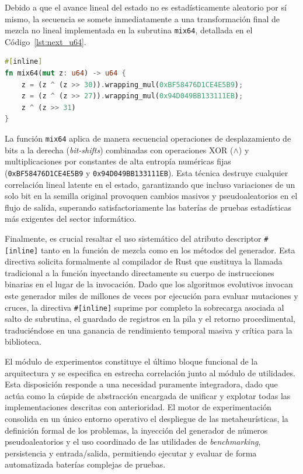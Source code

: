\documentclass[12pt,a4paper,twoside,openright]{book}
\begin{document}
        Debido a que el avance lineal del estado no es estadísticamente aleatorio por sí mismo, la secuencia se somete inmediatamente a una transformación final de mezcla no lineal implementada en la subrutina \texttt{mix64}, detallada en el Código~\ref{lst:next_u64}.

    \noindent
    \begin{samepage}
    \begin{lstlisting}[language=Rust, caption={Función de mezcla no lineal \texttt{mix64} para maximizar la entropía de los bits generados.}, label={lst:next_u64}]
#[inline]
fn mix64(mut z: u64) -> u64 {
    z = (z ^ (z >> 30)).wrapping_mul(0xBF58476D1CE4E5B9);
    z = (z ^ (z >> 27)).wrapping_mul(0x94D049BB133111EB);
    z ^ (z >> 31)
}
    \end{lstlisting}
    \end{samepage}

        La función \texttt{mix64} aplica de manera secuencial operaciones de desplazamiento de bits a la derecha (\textit{bit-shifts}) combinadas con operaciones XOR ($\wedge$) y multiplicaciones por constantes de alta entropía numéricas fijas (\texttt{0xBF58476D1CE4E5B9} y \texttt{0x94D049BB133111EB}). Esta técnica destruye cualquier correlación lineal latente en el estado, garantizando que incluso variaciones de un solo bit en la semilla original provoquen cambios masivos y pseudoaleatorios en el flujo de salida, superando satisfactoriamente las baterías de pruebas estadísticas más exigentes del sector informático. 

        Finalmente, es crucial resaltar el uso sistemático del atributo descriptor \texttt{\#[inline]} tanto en la función de mezcla como en los métodos del generador. Esta directiva solicita formalmente al compilador de Rust que sustituya la llamada tradicional a la función inyectando directamente su cuerpo de instrucciones binarias en el lugar de la invocación. Dado que los algoritmos evolutivos invocan este generador miles de millones de veces por ejecución para evaluar mutaciones y cruces, la directiva \texttt{\#[inline]} suprime por completo la sobrecarga asociada al salto de subrutina, el guardado de registros en la pila y el retorno procedimental, traduciéndose en una ganancia de rendimiento temporal masiva y crítica para la biblioteca.

    
        El módulo de experimentos constituye el último bloque funcional de la arquitectura y se especifica en estrecha correlación junto al módulo de utilidades. Esta disposición responde a una necesidad puramente integradora, dado que actúa como la cúspide de abstracción encargada de unificar y explotar todas las implementaciones descritas con anterioridad. El motor de experimentación consolida en un único entorno operativo el despliegue de las metaheurísticas, la definición formal de los problemas, la inyección del generador de números pseudoaleatorios y el uso coordinado de las utilidades de \textit{benchmarking}, persistencia y entrada/salida, permitiendo ejecutar y evaluar de forma automatizada baterías complejas de pruebas.
\end{document}
